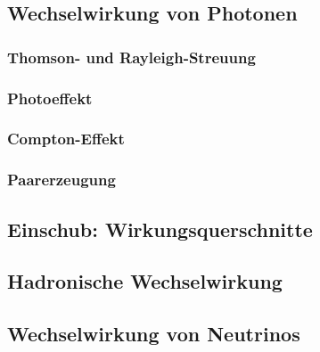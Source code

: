 \documentclass{article}
\begin{document}
\graphicspath{{bilder/1-2/}}
	\subsection{Wechselwirkung von Photonen}
		
			\subsubsection{Thomson- und Rayleigh-Streuung}
				
			\subsubsection{Photoeffekt}
				 
			\subsubsection{Compton-Effekt}
				
			\subsubsection{Paarerzeugung}
				
	\subsection{Einschub: Wirkungsquerschnitte}
		
				
\graphicspath{{bilder/1-345/}}
	\subsection{Hadronische Wechselwirkung}
		
	\subsection{Wechselwirkung von Neutrinos}
		
\end{document}
